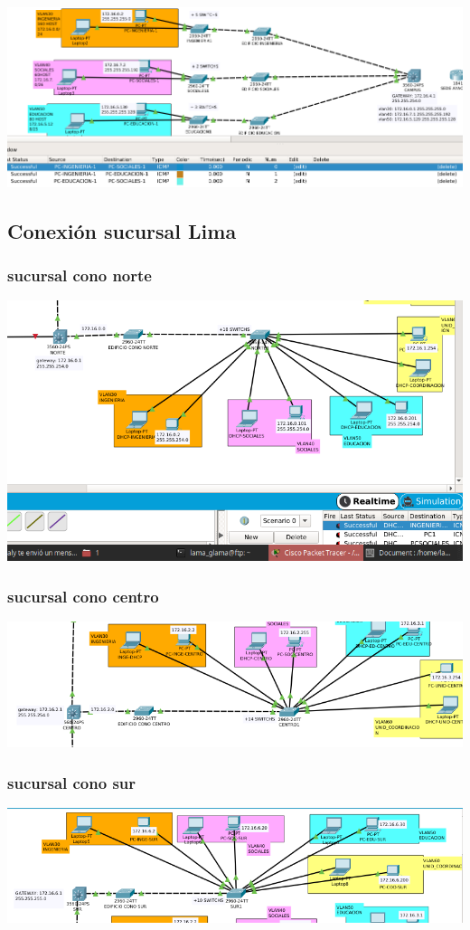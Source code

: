 \includegraphics[scale=0.4]{img/VLANCAMPUSSUCESS.png} 
\subsection{Conexi\'on sucursal Lima}
\subsubsection{sucursal cono norte}
\includegraphics[scale=0.45]{img/VLANNORTE.png} \\
\subsubsection{sucursal cono centro}
\includegraphics[scale=0.45]{img/VLANCENTRO.png} 

\subsubsection{sucursal cono sur}
\includegraphics[scale=0.45]{img/VLANSUR.png} 

